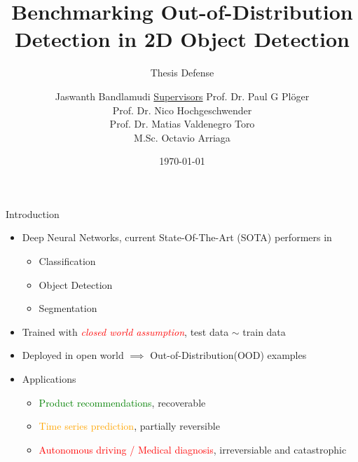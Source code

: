 \documentclass[10pt, aspectratio=169]{beamer}
\author[Jaswanth]{Jaswanth Bandlamudi \newline \newline \underline{Supervisors} \newline \vfill Prof. Dr. Paul G Pl\"{o}ger\\Prof. Dr. Nico Hochgeschwender \\ Prof. Dr. Matias Valdenegro Toro \\ M.Sc. Octavio Arriaga}
\title{Benchmarking Out-of-Distribution Detection in 2D Object Detection}
\subtitle{Thesis Defense}
\institute[HBRS]{Hochschule Bonn-Rhein-Sieg}
\date{\today}
\begin{document}
\setlength{\parskip}{1em}
\renewcommand{\baselinestretch}{1.25}
{
\begin{frame}
\titlepage
\end{frame}
}

\begin{frame}{Introduction}
\begin{itemize}
    \item Deep Neural Networks, current State-Of-The-Art (SOTA) performers in 
    \begin{itemize}
        \item Classification
        \item Object Detection
        \item Segmentation
    \end{itemize} 

    \item Trained with \textcolor{red}{\textit{closed world assumption}}, test data $\sim$ train data
    \item Deployed in open world $\implies$ Out-of-Distribution(OOD) examples
    \item Applications
        \begin{itemize}
            \item \textcolor{green}{Product recommendations}, recoverable
            \item \textcolor{orange}{Time series prediction}, partially reversible
            \item \textcolor{red}{Autonomous driving / Medical diagnosis}, irreversiable and catastrophic
        \end{itemize}
\end{itemize}
\end{frame}
\end{document}
